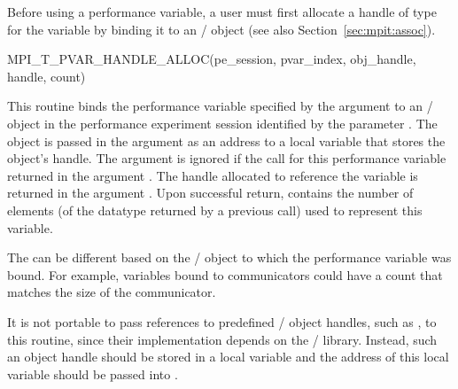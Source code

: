 Before using a performance variable, a user must first allocate a handle of
type  for
the variable by binding it to an \MPI/ object (see also
Section~\ref{sec:mpit:assoc}).

\begin{funcdef}{MPI\_T\_PVAR\_HANDLE\_ALLOC}{(\mbox{pe\_session}, \mbox{pvar\_index}, \mbox{obj\_handle}, \mbox{handle}, \mbox{count})}
\end{funcdef}

This routine binds the performance variable specified by the argument
 to an \MPI/ object  in the performance experiment session identified by the
parameter .  The object is passed in the argument
 as an address to a local variable that stores the
object's handle.  The argument  is ignored if the
 call for this performance variable
returned  in the argument .
The handle allocated to reference the variable is returned in the argument
.  Upon successful return,  contains the
number of elements (of the datatype returned by a previous
 call) used to represent this variable.

\begin{users}
The  can be different based on the \MPI/ object to which the
performance variable was bound.  For example, variables bound to
communicators could have a count that matches the size of the communicator.

It is not portable to pass references to predefined \MPI/ object handles,
such as , to this routine, since their
implementation depends on the \MPI/ library.  Instead, such an object
handle should be stored in a local variable and the address of this local
variable should be passed into .
\end{users}

